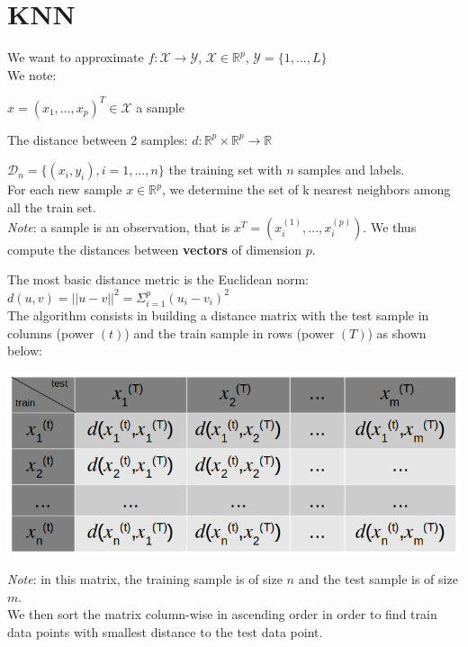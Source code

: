 \section*{KNN}

We want to approximate $f: \mathcal{X} \to \mathcal{Y}$, $\mathcal{X} \in \mathbb{R}^p$, $\mathcal{Y}=\{1,...,L\}$ \\

We note:

$x=(x_1,...,x_p)^T \in \mathcal{X}$ a sample

The distance between 2 samples: $d: \mathbb{R}^p \times \mathbb{R}^p \to \mathbb{R}$

$\mathcal{D}_n=\{(x_i,y_i),i=1,...,n\}$ the training set with $n$ samples and labels. \\

For each new sample $x \in \mathbb{R}^p$, we determine the set of k nearest neighbors among all the train set. \\

\textit{Note}: a sample is an observation, that is $x^T=(x_i^{(1)},...,x_i^{(p)})$. We thus compute the distances between \textbf{vectors} of dimension $p$.

The most basic distance metric is the Euclidean norm: $d(u,v)=||u-v||^2=\Sigma_{i=1}^p(u_i-v_i)^2$ \\

The algorithm consists in building a distance matrix with the test sample in columns (power $(t)$) and the train sample in rows (power $(T)$) as shown below:

\begin{center}
\includegraphics[scale=0.3]{KNN_matrix.png}
\end{center}

\textit{Note}: in this matrix, the training sample is of size $n$ and the test sample is of size $m$. \\

We then sort the matrix column-wise in ascending order in order to find train data points with smallest distance to the test data point. \\

